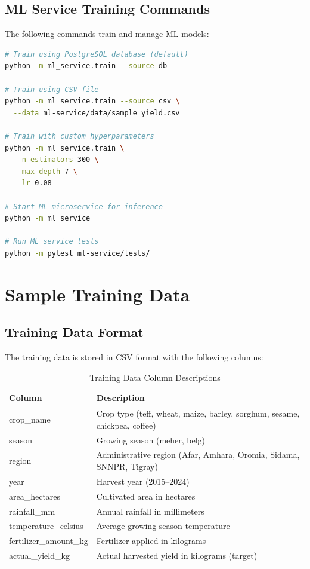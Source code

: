 \section{ML Service Training Commands}

The following commands train and manage ML models:

\begin{lstlisting}[caption=ML Service Training Commands,language=bash]
# Train using PostgreSQL database (default)
python -m ml_service.train --source db

# Train using CSV file
python -m ml_service.train --source csv \
  --data ml-service/data/sample_yield.csv

# Train with custom hyperparameters
python -m ml_service.train \
  --n-estimators 300 \
  --max-depth 7 \
  --lr 0.08

# Start ML microservice for inference
python -m ml_service

# Run ML service tests
python -m pytest ml-service/tests/
\end{lstlisting}


\chapter{Sample Training Data}

\section{Training Data Format}

The training data is stored in CSV format with the following columns:

\begin{longtable}{ll}
\caption{Training Data Column Descriptions}
\label{tab:train-cols} \\
\toprule
\textbf{Column} & \textbf{Description} \\
\midrule
\endhead
\midrule
\endfoot
\bottomrule
\endlastfoot
crop\_name & Crop type (teff, wheat, maize, barley, sorghum, sesame, chickpea, coffee) \\
season & Growing season (meher, belg) \\
region & Administrative region (Afar, Amhara, Oromia, Sidama, SNNPR, Tigray) \\
year & Harvest year (2015--2024) \\
area\_hectares & Cultivated area in hectares \\
rainfall\_mm & Annual rainfall in millimeters \\
temperature\_celsius & Average growing season temperature \\
fertilizer\_amount\_kg & Fertilizer applied in kilograms \\
actual\_yield\_kg & Actual harvested yield in kilograms (target) \\
\end{longtable}

